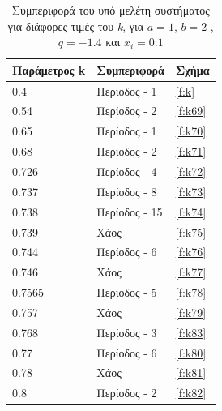 \begin{table}[h!]
	\centering
	\caption{ Συμπεριφορά του υπό μελέτη συστήματος για διάφορες τιμές του \emph{k}, για $a = 1$, $b = 2$ , $q=-1.4$ και
		\(x_i=0.1\)}
	\label{tab:abc6}
	\begin{tabular}{l | l | l}
		Παράμετρος k & Συμπεριφορά & Σχήμα\\
		\hline
		0.4 &  Περίοδος -  1 & \ref{f:k}\\
		0.54 &  Περίοδος -  2 & \ref{f:k69}\\
		0.65& Περίοδος -  1 & \ref{f:k70}\\
		0.68& Περίοδος -  2 & \ref{f:k71}\\
		0.726 &  Περίοδος -  4 & \ref{f:k72}\\
		0.737& Περίοδος -  8 & \ref{f:k73}\\
		0.738& Περίοδος -  15 & \ref{f:k74}\\
		0.739& Χάος & \ref{f:k75}\\
		0.744 &  Περίοδος -  6 & \ref{f:k76}\\
		0.746 &  Χάος & \ref{f:k77}\\
		0.7565 &  Περίοδος -  5 & \ref{f:k78}\\
		0.757 &  Χάος & \ref{f:k79}\\
		0.768 &  Περίοδος -  3 & \ref{f:k83}\\
		0.77 &  Περίοδος -  6 & \ref{f:k80}\\
		0.78 &  Χάος & \ref{f:k81}\\
		0.8 & Περίοδος -  2&\ref{f:k82}\\
	\end{tabular}
\end{table}

